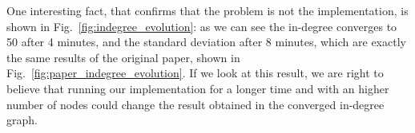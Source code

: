 One interesting fact, that confirms that the problem is not the implementation, is shown in Fig.~\ref{fig:indegree_evolution}: as we can see the in-degree converges to 50 after 4 minutes, and the standard deviation after 8 minutes, which are exactly the same results of the original paper, shown in Fig.~\ref{fig:paper_indegree_evolution}. If we look at this result, we are right to believe that running our implementation for a longer time and with an higher number of nodes could change the result obtained in the converged in-degree graph.



